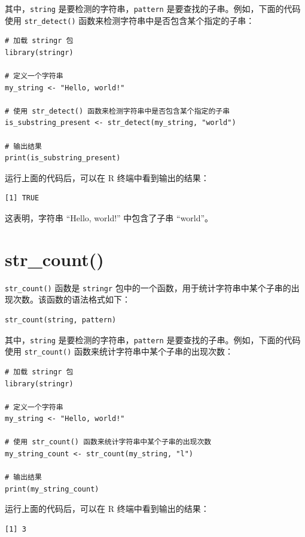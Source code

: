 \documentclass[
  letterpaper,
  DIV=11,
  numbers=noendperiod]{scrreprt}
\begin{document}
其中，\texttt{string} 是要检测的字符串，\texttt{pattern}
是要查找的子串。例如，下面的代码使用 \texttt{str\_detect()}
函数来检测字符串中是否包含某个指定的子串：

\begin{verbatim}
# 加载 stringr 包
library(stringr)

# 定义一个字符串
my_string <- "Hello, world!"

# 使用 str_detect() 函数来检测字符串中是否包含某个指定的子串
is_substring_present <- str_detect(my_string, "world")

# 输出结果
print(is_substring_present)
\end{verbatim}

运行上面的代码后，可以在 R 终端中看到输出的结果：

\begin{verbatim}
[1] TRUE
\end{verbatim}

这表明，字符串 ``Hello, world!'' 中包含了子串 ``world''。

\hypertarget{str_count}{%
\section{str\_count()}\label{str_count}}

\texttt{str\_count()} 函数是 \texttt{stringr}
包中的一个函数，用于统计字符串中某个子串的出现次数。该函数的语法格式如下：

\begin{verbatim}
str_count(string, pattern)
\end{verbatim}

其中，\texttt{string} 是要检测的字符串，\texttt{pattern}
是要查找的子串。例如，下面的代码使用 \texttt{str\_count()}
函数来统计字符串中某个子串的出现次数：

\begin{verbatim}
# 加载 stringr 包
library(stringr)

# 定义一个字符串
my_string <- "Hello, world!"

# 使用 str_count() 函数来统计字符串中某个子串的出现次数
my_string_count <- str_count(my_string, "l")

# 输出结果
print(my_string_count)
\end{verbatim}

运行上面的代码后，可以在 R 终端中看到输出的结果：

\begin{verbatim}
[1] 3
\end{verbatim}
\end{document}
